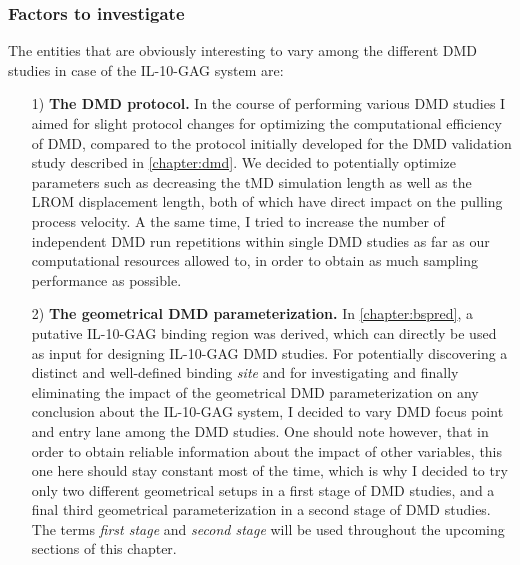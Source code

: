 \subsubsection{Factors to investigate}

The entities that are obviously interesting to vary among the different DMD
studies in case of the IL-10-GAG system are:

\begin{itemize}

\item[1)] \textbf{The DMD protocol.} In the course of performing various DMD
studies I aimed for slight protocol changes for optimizing the computational
efficiency of DMD, compared to the protocol initially developed for the DMD
validation study described in \cref{chapter:dmd}. We decided to potentially
optimize parameters such as decreasing the tMD simulation length as well as the
LROM displacement length, both of which have direct impact on the pulling
process velocity. A the same time, I tried to increase the number of
independent DMD run repetitions within single DMD studies as far as our
computational resources allowed to, in order to obtain as much sampling
performance as possible.

\item[2)] \textbf{The geometrical DMD parameterization.} In
\cref{chapter:bspred}, a putative IL-10-GAG binding region was derived, which
can directly be used as input for designing IL-10-GAG DMD studies. For
potentially discovering a distinct and well-defined binding \textit{site} and
for investigating and finally eliminating the impact of the geometrical DMD
parameterization on any conclusion about the IL-10-GAG system, I decided to vary
DMD focus point and entry lane among the DMD studies. One should note however,
that in order to obtain reliable information about the impact of other
variables, this one here should stay constant most of the time, which is why I
decided to try only two different geometrical setups in a first stage of DMD
studies, and a final third geometrical parameterization in a second stage of
DMD studies. The terms \textit{first stage} and \textit{second stage} will be
used throughout the upcoming sections of this chapter.


\end{itemize}
